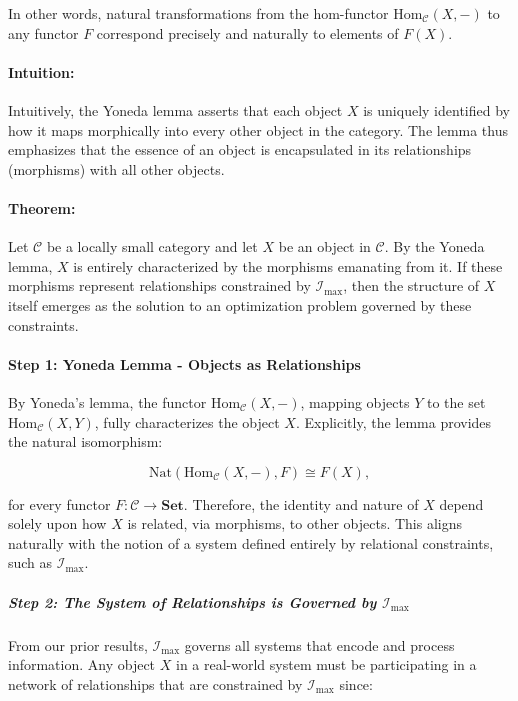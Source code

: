 \documentclass[12pt]{article}
\begin{document}
In other words, natural transformations from the hom-functor \(\mathrm{Hom}_{\mathcal{C}}(X,-)\) to any functor \(F\) correspond precisely and naturally to elements of \(F(X)\).

\paragraph{Intuition:}
Intuitively, the Yoneda lemma asserts that each object \( X \) is uniquely identified by how it maps morphically into every other object in the category. The lemma thus emphasizes that the essence of an object is encapsulated in its relationships (morphisms) with all other objects.

\paragraph{Theorem:}
Let \(\mathcal{C}\) be a locally small category and let \(X\) be an object in \(\mathcal{C}\). By the Yoneda lemma, \(X\) is entirely characterized by the morphisms emanating from it. If these morphisms represent relationships constrained by \(\mathcal{I}_{\max}\), then the structure of \(X\) itself emerges as the solution to an optimization problem governed by these constraints.

\paragraph{Step 1: Yoneda Lemma - Objects as Relationships}
By Yoneda's lemma, the functor \(\mathrm{Hom}_{\mathcal{C}}(X,-)\), mapping objects \(Y\) to the set \(\mathrm{Hom}_{\mathcal{C}}(X,Y)\), fully characterizes the object \(X\). Explicitly, the lemma provides the natural isomorphism:

\begin{equation}
\mathrm{Nat}(\mathrm{Hom}_{\mathcal{C}}(X,-),F) \cong F(X),
\end{equation}

for every functor \(F: \mathcal{C} \to \mathbf{Set}\). Therefore, the identity and nature of \(X\) depend solely upon how \(X\) is related, via morphisms, to other objects. This aligns naturally with the notion of a system defined entirely by relational constraints, such as \(\mathcal{I}_{\max}\).


\subparagraph{Step 2: The System of Relationships is Governed by \(\mathcal{I}_{\max}\)}
From our prior results, \(\mathcal{I}_{\max}\) governs all systems that encode and process information. Any object \( X \) in a real-world system must be participating in a network of relationships that are constrained by \(\mathcal{I}_{\max}\) since:
\end{document}

